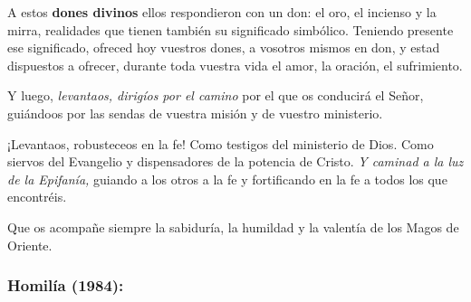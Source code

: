 \begin{body}
					A estos \textbf{dones divinos} ellos respondieron con un don: el oro, el incienso y la mirra, realidades que tienen también su significado simbólico. Teniendo presente ese significado, ofreced hoy vuestros dones, a vosotros mismos en don, y estad dispuestos a ofrecer, durante toda vuestra vida el amor, la oración, el sufrimiento.
					
					Y luego, \emph{levantaos, dirigíos por el camino} por el que os conducirá el Señor, guiándoos por las sendas de vuestra misión y de vuestro ministerio.
					
					¡Levantaos, robusteceos en la fe! Como testigos del ministerio de Dios. Como siervos del Evangelio y dispensadores de la potencia de Cristo. \emph{Y caminad a la luz de la Epifanía,} guiando a los otros a la fe y fortificando en la fe a todos los que encontréis.
					
					Que os acompañe siempre la sabiduría, la humildad y la valentía de los Magos de Oriente.
				\end{body}
			
			\subsubsection{Homilía (1984):}
			
				
